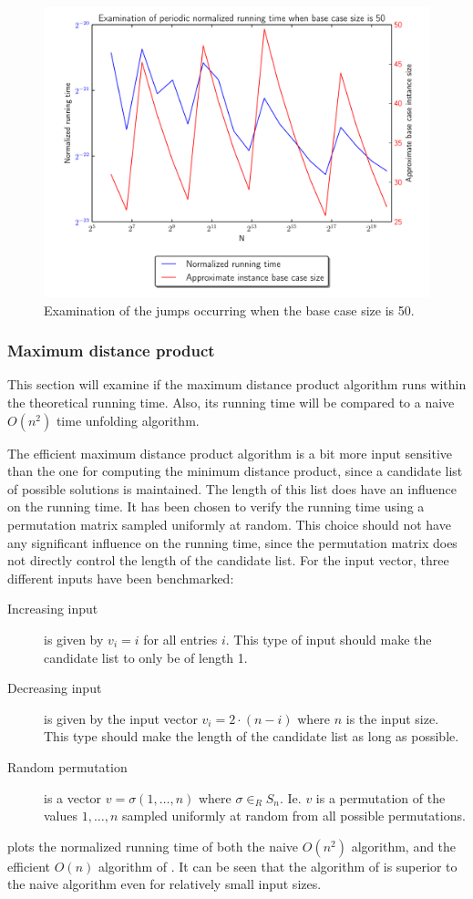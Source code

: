 \documentclass[twoside,11pt,openright]{report}
\begin{document}
\begin{figure}[h!]
  \centering
  \includegraphics[width=11.3cm]{distance-mult/min-dist-mult-bc50}
  \caption{Examination of the jumps occurring when the base case size is 50.}
  \label{fig:benchmark:min-distance:bc50}
\end{figure}

\clearpage
\subsubsection{Maximum distance product}
This section will examine if the maximum distance product algorithm runs within the theoretical running time. Also, its running time will be compared to a naive $O(n^2)$ time unfolding algorithm.

The efficient maximum distance product algorithm is a bit more input sensitive than the one for computing the minimum distance product, since a candidate list of possible solutions is maintained. The length of this list does have an influence on the running time. It has been chosen to verify the running time using a permutation matrix sampled uniformly at random. This choice should not have any significant influence on the running time, since the permutation matrix does not directly control the length of the candidate list. For the input vector, three different inputs have been benchmarked:
\begin{description}
  \item[Increasing input] is given by $v_i = i$ for all entries $i$. This type of input should make the candidate list to only be of length 1.
  \item[Decreasing input] is given by the input vector $v_i = 2 \cdot (n - i)$ where $n$ is the input size. This type should make the length of the candidate list as long as possible.
  \item[Random permutation] is a vector $v = \sigma(1, \dots, n)$ where $\sigma \in_R S_n$. Ie. $v$ is a permutation of the values $1, \dots, n$ sampled uniformly at random from all possible permutations.
\end{description}
 plots the normalized running time of both the naive $O(n^2)$ algorithm, and the efficient $O(n)$ algorithm of \cite{Gawrychowski:2012:FAC:2422024.2422048}. It can be seen that the algorithm of \cite{Gawrychowski:2012:FAC:2422024.2422048} is superior to the naive algorithm even for relatively small input sizes.
\end{document}

